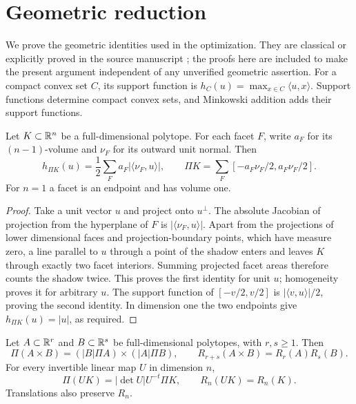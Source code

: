 \section{Geometric reduction}\label{sec:proj-geometry}

We prove the geometric identities used in the optimization. They are
classical or explicitly proved in the source manuscript
\cite{OpenAIProjection}; the proofs here are included to make the
present argument independent of any unverified geometric assertion.
For a compact convex set $C$, its support function is
$h_C(u)=\max_{x\in C}\langle u,x\rangle$. Support functions determine
compact convex sets, and Minkowski addition adds their support
functions.

\begin{lemma}\label{lem:proj-facets}
Let $K\subset\mathbb R^n$ be a full-dimensional polytope. For each facet $F$,
write $a_F$ for its $(n-1)$-volume and $\nu_F$ for its outward unit
normal. Then
\[
 h_{\Pi K}(u)=\frac12\sum_F a_F|\langle\nu_F,u\rangle|,
 \qquad
 \Pi K=\sum_F[-a_F\nu_F/2,a_F\nu_F/2].
\]
For $n=1$ a facet is an endpoint and has volume one.
\end{lemma}

\begin{proof}
Take a unit vector $u$ and project onto $u^\perp$. The absolute
Jacobian of projection from the hyperplane of $F$ is
$|\langle\nu_F,u\rangle|$. Apart from the projections of lower
dimensional faces and projection-boundary points, which have measure
zero, a line parallel to $u$ through a point of the shadow enters and
leaves $K$ through exactly two facet interiors. Summing projected facet
areas therefore counts the shadow twice. This proves the first
identity for unit $u$; homogeneity proves it for arbitrary $u$.
The support function of $[-v/2,v/2]$ is
$|\langle v,u\rangle|/2$, proving the second identity. In dimension
one the two endpoints give $h_{\Pi K}(u)=|u|$, as required.
\end{proof}

\begin{proposition}\label{prop:proj-product}
Let $A\subset\mathbb R^r$ and $B\subset\mathbb R^s$ be full-dimensional polytopes,
with $r,s\ge1$. Then
\[
 \Pi(A\times B)=(|B|\Pi A)\times(|A|\Pi B),
 \qquad R_{r+s}(A\times B)=R_r(A)R_s(B).
\]
For every invertible linear map $U$ in dimension $n$,
\[
 \Pi(UK)=|\det U|U^{-t}\Pi K,
 \qquad R_n(UK)=R_n(K).
\]
Translations also preserve $R_n$.
\end{proposition}


